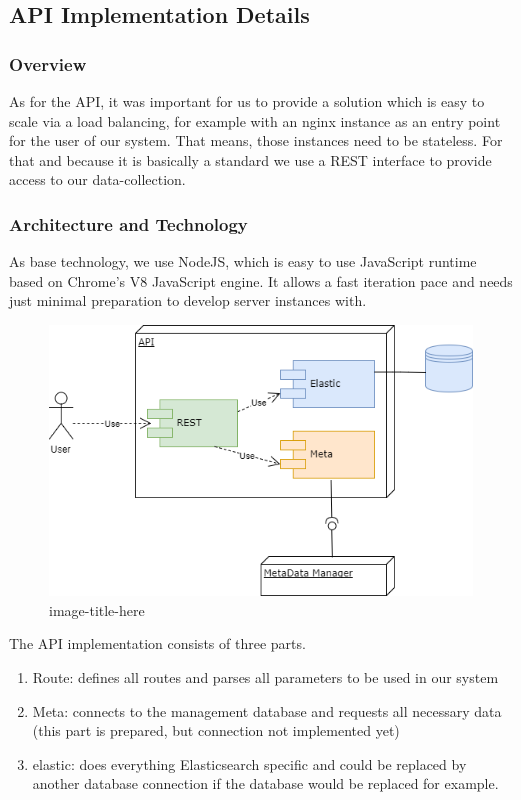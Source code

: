 \subsection{API Implementation
Details}\label{api-implementation-details}

\subsubsection{Overview}\label{overview-1}

As for the API, it was important for us to provide a solution which is
easy to scale via a load balancing, for example with an nginx instance
as an entry point for the user of our system. That means, those
instances need to be stateless. For that and because it is basically a
standard we use a REST interface to provide access to our
data-collection.

\subsubsection{Architecture and
Technology}\label{architecture-and-technology}

As base technology, we use NodeJS, which is easy to use JavaScript
runtime based on Chrome's V8 JavaScript engine. It allows a fast
iteration pace and needs just minimal preparation to develop server
instances with.

\begin{figure}[htbp]
\centering
\includegraphics{images/07_API_Architecture.png}
\caption{image-title-here}
\end{figure}

The API implementation consists of three parts.

\begin{enumerate}
\def\labelenumi{\arabic{enumi}.}
\tightlist
\item
  Route: defines all routes and parses all parameters to be used in our
  system
\item
  Meta: connects to the management database and requests all necessary
  data (this part is prepared, but connection not implemented yet)
\item
  elastic: does everything Elasticsearch specific and could be replaced
  by another database connection if the database would be replaced for
  example.
\end{enumerate}

